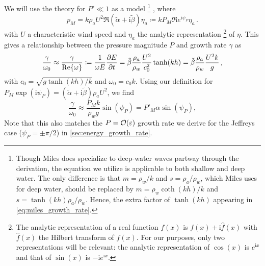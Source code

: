 \documentclass{jfm}
\newcommand{\im}{\mathrm{i}}
\renewcommand*{\epsilon}{\varepsilon}
\begin{document}
We will use the \citet{miles1957generation} theory for $P' \ll 1$ as a model%
\footnote{
  Though Miles does specialize to deep-water waves partway through the
  derivation, the equation we utilize is applicable to both shallow and
  deep water.
  The only difference is that $m = \rho_w/k$ and $s=\rho_a/\rho_w$,
  which Miles uses for deep water, should be replaced by
  $m=\rho_w\coth(kh)/k$ and $s = \tanh(kh) \rho_a/\rho_w$.
  Hence, the extra factor of $\tanh(kh)$ appearing in
  \cref{eq:miles_growth_rate}.
}%
, where
\begin{equation}
  p_M = k \rho_a U^2 \Re{(\tilde{\alpha} + \im \tilde{\beta}) \eta_a}
  \coloneqq k P_M \Re{ e^{\im \psi_P} \eta_a} \,.
\end{equation}
with $U$ a characteristic wind speed and $\eta_a$ the analytic
representation%
\footnote{
  The analytic representation of a real function $f(x)$ is $f(x) + \im
  \hat{f}(x)$ with $\hat{f}(x)$ the Hilbert transform of $f(x)$.
  For our purposes, only two representations will be relevant: the
  analytic representation of $\cos(x)$ is $e^{\im x}$ and that of
  $\sin(x)$ is $-\im e^{\im x}$.
}
of $\eta$.
This gives a relationship between the pressure magnitude $P$ and growth
rate $\gamma$ as
\begin{equation}
  \frac{\gamma}{\omega_0} \approx \frac{\gamma}{\Re{\omega}} \coloneqq
  \frac{1}{\omega E} \pdv{E}{t}
  = \tilde{\beta} \frac{\rho_a}{\rho_w} \frac{U^2}{c_0^2} \tanh(kh)
  = \tilde{\beta} \frac{\rho_a}{\rho_w} \frac{U^2 k}{g} \,,
  \label{eq:miles_growth_rate}
\end{equation}
with $c_0 = \sqrt{g\tanh(kh)/k}$ and $\omega_0 = c_0 k$.
Using our definition for $P_M \exp(\im \psi_P) = (\tilde{\alpha} + \im
\tilde{\beta}) \rho_a U^2$, we find
\begin{equation}
  \frac{\gamma}{\omega_0} \approx \frac{P_M k}{\rho_w g} \sin(\psi_P)
  = P'_M \alpha \sin(\psi_P)
  ,
\end{equation}
Note that this also matches the $P = \order{\epsilon}$ growth rate we
derive for the Jeffreys case (\ie $\psi_P = \pm \pi/2$) in
\cref{sec:energy_growth_rate}.
\end{document}
